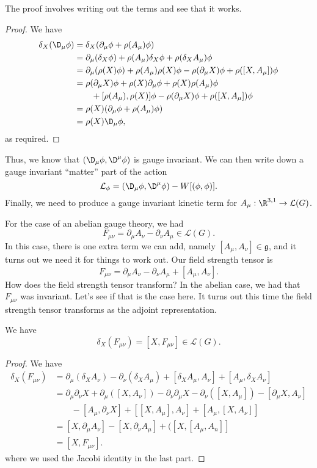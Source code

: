 \documentclass[a4paper]{article}
\begin{document}
The proof involves writing out the terms and see that it works.
\begin{proof}
  We have
  \begin{align*}
    \delta_X (\D_\mu \phi) &= \delta_X(\partial_\mu \phi + \rho(A_\mu) \phi)\\
    &= \partial_\mu (\delta_X\phi) + \rho(A_\mu) \delta_X \phi + \rho(\delta_X A_\mu)\phi\\
    &= \partial_\mu (\rho(X) \phi) + \rho(A_\mu) \rho(X) \phi - \rho(\partial_\mu X) \phi + \rho([X, A_\mu]) \phi\\
    &= \rho(\partial_\mu X) \phi + \rho(X) \partial_\mu \phi + \rho(X)\rho(A_\mu) \phi \\
    &\quad\quad+ [\rho(A_\mu), \rho(X)] \phi - \rho(\partial_\mu X) \phi + \rho([X, A_\mu])\phi\\
    &= \rho(X)(\partial_\mu \phi + \rho(A_\mu) \phi)\\
    &= \rho(X) \D_\mu \phi,
  \end{align*}
  as required.
\end{proof}

Thus, we know that $(\D_\mu \phi, \D^\mu \phi)$ is gauge invariant. We can then write down a gauge invariant ``matter'' part of the action
\[
  \mathcal{L}_\phi = (\D_\mu \phi, \D^\mu \phi) - W[(\phi, \phi)].
\]
Finally, we need to produce a gauge invariant kinetic term for $A_\mu: \R^{3, 1} \to \mathcal{L}(G)$.

For the case of an abelian gauge theory, we had
\[
  F_{\mu\nu} = \partial_\mu A_\nu - \partial_\nu A_\mu \in \mathcal{L}(G).
\]
In this case, there is one extra term we can add, namely $[A_\mu, A_\nu] \in \mathfrak{g}$, and it turns out we need it for things to work out. Our field strength tensor is
\[
  F_{\mu\nu} = \partial_\mu A_\nu - \partial_\nu A_\mu + [A_\mu, A_\nu].
\]
How does the field strength tensor transform? In the abelian case, we had that $F_{\mu\nu}$ was invariant. Let's see if that is the case here. It turns out this time the field strength tensor transforms as the adjoint representation.
\begin{lemma}
  We have
  \[
    \delta_X (F_{\mu\nu}) = [X, F_{\mu\nu}] \in \mathcal{L}(G).
  \]
\end{lemma}

\begin{proof}
  We have
  \begin{align*}
    \delta_X(F_{\mu\nu}) &= \partial_\mu (\delta_X A_\nu) - \partial_\nu (\delta_X A_\mu) + [\delta_X A_\mu, A_\nu] + [A_\mu, \delta_X A_\nu]\\
    &= \partial_\mu \partial_\nu X + \partial_\mu ([X, A_\nu]) - \partial_\nu \partial_\mu X - \partial_\nu ([X, A_\mu]) - [\partial_\mu X, A_\nu]\\
    &\quad\quad- [A_\mu, \partial_\nu X] + [[X, A_\mu ], A_\nu] + [A_\mu, [X, A_\nu]]\\
    &= [X, \partial_\mu A_\nu] - [X, \partial_\nu A_\mu] +([X, [A_\mu, A_n]]\\
    &= [X, F_{\mu\nu}].
  \end{align*}
  where we used the Jacobi identity in the last part.
\end{proof}
\end{document}
